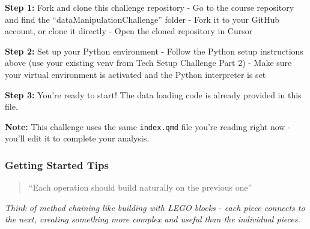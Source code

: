 \documentclass[
  letterpaper,
  DIV=11,
  numbers=noendperiod]{scrartcl}
\begin{document}
\begin{tcolorbox}[enhanced jigsaw, bottomtitle=1mm, opacitybacktitle=0.6, toptitle=1mm, colbacktitle=quarto-callout-important-color!10!white, breakable, coltitle=black, bottomrule=.15mm, left=2mm, colframe=quarto-callout-important-color-frame, colback=white, title=\textcolor{quarto-callout-important-color}{\faExclamation}\hspace{0.5em}{📁 Getting Started}, leftrule=.75mm, arc=.35mm, rightrule=.15mm, opacityback=0, toprule=.15mm, titlerule=0mm]

\textbf{Step 1:} Fork and clone this challenge repository - Go to the
course repository and find the ``dataManipulationChallenge'' folder -
Fork it to your GitHub account, or clone it directly - Open the cloned
repository in Cursor

\textbf{Step 2:} Set up your Python environment - Follow the Python
setup instructions above (use your existing venv from Tech Setup
Challenge Part 2) - Make sure your virtual environment is activated and
the Python interpreter is set

\textbf{Step 3:} You're ready to start! The data loading code is already
provided in this file.

\textbf{Note:} This challenge uses the same \texttt{index.qmd} file
you're reading right now - you'll edit it to complete your analysis.

\end{tcolorbox}

\subsubsection{Getting Started Tips}\label{getting-started-tips}

\begin{tcolorbox}[enhanced jigsaw, bottomtitle=1mm, opacitybacktitle=0.6, toptitle=1mm, colbacktitle=quarto-callout-note-color!10!white, breakable, coltitle=black, bottomrule=.15mm, left=2mm, colframe=quarto-callout-note-color-frame, colback=white, title=\textcolor{quarto-callout-note-color}{\faInfo}\hspace{0.5em}{🎯 Method Chaining Philosophy}, leftrule=.75mm, arc=.35mm, rightrule=.15mm, opacityback=0, toprule=.15mm, titlerule=0mm]

\begin{quote}
``Each operation should build naturally on the previous one''
\end{quote}

\emph{Think of method chaining like building with LEGO blocks - each
piece connects to the next, creating something more complex and useful
than the individual pieces.}

\end{tcolorbox}
\end{document}

